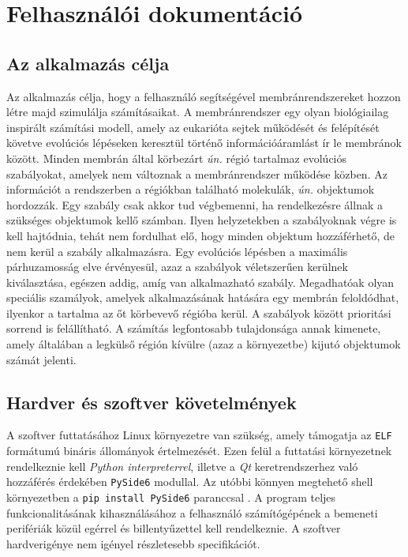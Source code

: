 \chapter{Felhasználói dokumentáció}
\label{ch:user}


\section{Az alkalmazás célja}

Az alkalmazás célja, hogy a felhasználó segítségével membránrendszereket hozzon létre majd szimulálja számításaikat. A membránrendszer egy olyan biológiailag inspirált számítási modell, amely az eukarióta sejtek működését és felépítését követve evolúciós lépéseken keresztül történő információáramlást ír le membránok között. Minden membrán által körbezárt \textit{ún.} régió tartalmaz evolúciós szabályokat, amelyek nem változnak a membránrendszer működése közben. Az információt a rendszerben a régiókban található molekulák, \textit{ún.} objektumok hordozzák. Egy szabály csak akkor tud végbemenni, ha rendelkezésre állnak a szükséges objektumok kellő számban. Ilyen helyzetekben a szabályoknak végre is kell hajtódnia, tehát nem fordulhat elő, hogy minden objektum hozzáférhető, de nem kerül a szabály alkalmazásra. Egy evolúciós lépésben a maximális párhuzamosság elve érvényesül, azaz a szabályok véletszerűen kerülnek kiválasztása, egészen addig, amíg van alkalmazható szabály. Megadhatóak olyan speciális szamályok, amelyek alkalmazásának hatására egy membrán feloldódhat, ilyenkor a tartalma az őt körbevevő régióba kerül. A szabályok között prioritási sorrend is felállítható. A számítás legfontosabb tulajdonsága annak kimenete, amely általában a legkülső régión kívülre (azaz a környezetbe) kijutó objektumok számát jelenti.


\section{Hardver és szoftver követelmények}

A szoftver futtatásához Linux környezetre van szükség, amely támogatja az \verb|ELF| formátumú bináris állományok értelmezését. Ezen felül a futtatási környezetnek rendelkeznie kell \textit{Python interpreterrel}, illetve a \textit{Qt} keretrendszerhez való hozzáférés érdekében \verb|PySide6| modullal. Az utóbbi könnyen megtehető shell környezetben a \verb|pip install PySide6| paranccsal . A program teljes funkcionalitásának kihasználásához a felhasználó számítógépének a bemeneti perifériák közül egérrel és billentyűzettel kell rendelkeznie. A szoftver hardverigénye nem igényel részletesebb specifikációt.


